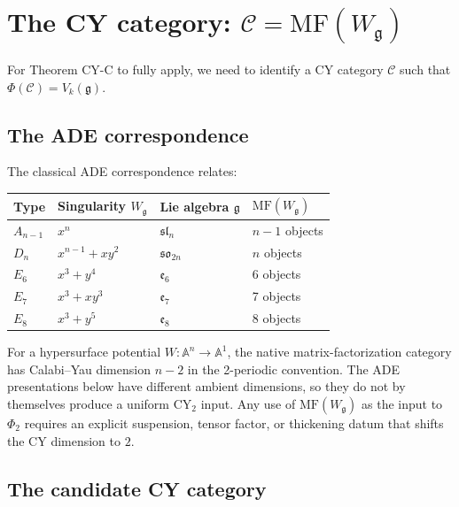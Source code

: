 \documentclass[11pt]{article}
\theoremstyle{definition}
\theoremstyle{remark}
\newcommand{\MF}{\mathrm{MF}}
\newcommand{\cC}{\mathcal{C}}
\newcommand{\frakg}{\mathfrak{g}}
\begin{document}
\section{The CY category: $\cC = \MF(W_\frakg)$}
\label{sec:cy-category}

For Theorem CY-C to fully apply, we need to identify a CY category
$\cC$ such that $\Phi(\cC) = V_k(\frakg)$.

\subsection{The ADE correspondence}
\label{subsec:ade}

The classical ADE correspondence relates:
\begin{center}
\renewcommand{\arraystretch}{1.4}
\begin{tabular}{llll}
 \hline
 \textbf{Type} & \textbf{Singularity $W_\frakg$} & \textbf{Lie algebra $\frakg$}
 & \textbf{$\MF(W_\frakg)$} \\
 \hline
 $A_{n-1}$ & $x^n$ & $\mathfrak{sl}_n$ & $n-1$ objects \\
 $D_n$ & $x^{n-1} + xy^2$ & $\mathfrak{so}_{2n}$ & $n$ objects \\
 $E_6$ & $x^3 + y^4$ & $\mathfrak{e}_6$ & 6 objects \\
 $E_7$ & $x^3 + xy^3$ & $\mathfrak{e}_7$ & 7 objects \\
 $E_8$ & $x^3 + y^5$ & $\mathfrak{e}_8$ & 8 objects \\
 \hline
\end{tabular}
\end{center}

For a hypersurface potential $W\colon \mathbb{A}^n\to\mathbb{A}^1$,
the native matrix-factorization category has Calabi--Yau dimension
$n-2$ in the 2-periodic convention. The ADE presentations below have
different ambient dimensions, so they do not by themselves produce a
uniform CY$_2$ input. Any use of $\MF(W_\frakg)$ as the input to
$\Phi_2$ requires an explicit suspension, tensor factor, or thickening
datum that shifts the CY dimension to $2$.

\subsection{The candidate CY category}
\label{subsec:candidate-cy}
\end{document}
